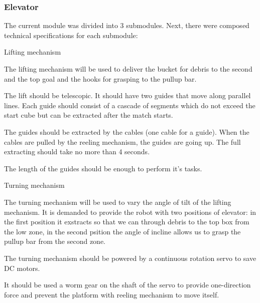 \subsubsection{Elevator}

\begin{enumerate*}

  \item The current module was divided into 3 submodules. Next, there were composed technical specifications for each submodule:
  \begin{enumerate*}
  	\item Lifting mechanism
  	\begin{enumerate*}
  		\item The lifting mechanism will be used to deliver the bucket for debris to the second and the top goal and the hooks for grasping to the pullup bar.
  		
  		\item The lift should be telescopic. It should have two guides that move along parallel lines. Each guide should consist of a cascade of segments which do not exceed the start cube but can be extracted after the match starts.
  		
  		\item The guides should be extracted by the cables (one cable for a guide). When the cables are pulled by the reeling mechanism, the guides are going up. The full extracting should take no more than 4 seconds.
  		
  		\item  The length of the guides should be enough to perform it's tasks.
  		
  	\end{enumerate*}
  	
  	\item Turning mechanism
  	\begin{enumerate*}
  		\item The turning mechanism will be used to vary the angle of tilt of the lifting mechanism. It is demanded to provide the robot with two positions of elevator: in the first position it exstracts so that we can through debris to the top box from the low zone, in the second psition the angle of incline allows us to grasp the pullup bar from the second zone.
  		
  		\item The turning mechanism should be powered by a continuous rotation servo to save DC motors.
  		
  		\item It should be used a worm gear on the shaft of the servo to provide one-direction force and prevent the platform with reeling mechanism to move itself.
  		

\end{enumerate*}
\end{enumerate*}
\end{enumerate*}
